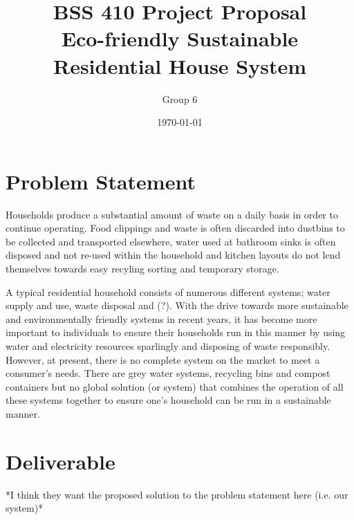 \documentclass{article}
\begin{document}
\title{\vspace{-5em} BSS 410 Project Proposal\\Eco-friendly Sustainable Residential House System}
\author{Group 6}
\date{\today}
\maketitle

\section{Problem Statement}
Households produce a substantial amount of waste on a daily basis in order to continue operating. Food clippings and waste is often discarded into dustbins to be collected and transported elsewhere, water used at bathroom sinks is often disposed and not re-used within the household and kitchen layouts do not lend themselves towards easy recyling sorting and temporary storage.

A typical residential household consists of numerous different systems; water supply and use, waste disposal and (?). With the drive towards more sustainable and environmentally friendly systems in recent years, it has become more important to individuals to ensure their households run in this manner by using water and electricity resources sparlingly and disposing of waste responsibly. However, at present, there is no complete system on the market to meet a consumer's needs. There are grey water systems, recycling bins and compost containers but no global solution (or system) that combines the operation of all these systems together to ensure one's household can be run in a sustainable manner.

\section{Deliverable}
*I think they want the proposed solution to the problem statement here (i.e. our system)*
\end{document}
